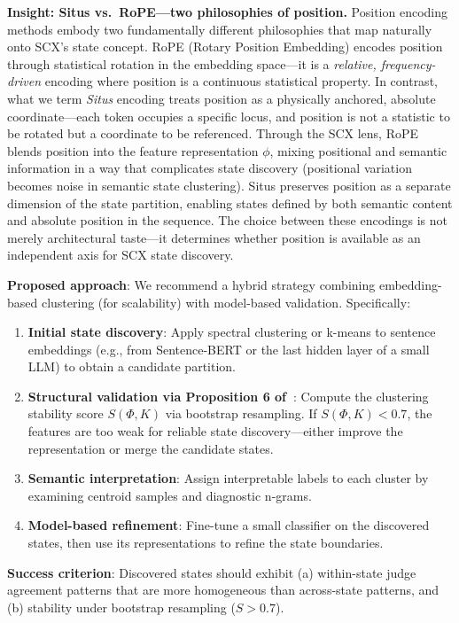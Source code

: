 \documentclass[11pt,twocolumn]{article}
\begin{document}
\textbf{Insight: Situs vs.\ RoPE---two philosophies of position.} Position encoding methods embody two fundamentally different philosophies that map naturally onto SCX's state concept. RoPE (Rotary Position Embedding) encodes position through statistical rotation in the embedding space---it is a \textit{relative, frequency-driven} encoding where position is a continuous statistical property. In contrast, what we term \textit{Situs} encoding treats position as a physically anchored, absolute coordinate---each token occupies a specific locus, and position is not a statistic to be rotated but a coordinate to be referenced. Through the SCX lens, RoPE blends position into the feature representation $\phi$, mixing positional and semantic information in a way that complicates state discovery (positional variation becomes noise in semantic state clustering). Situs preserves position as a separate dimension of the state partition, enabling states defined by both semantic content and absolute position in the sequence. The choice between these encodings is not merely architectural taste---it determines whether position is available as an independent axis for SCX state discovery.

\textbf{Proposed approach}: We recommend a hybrid strategy combining embedding-based clustering (for scalability) with model-based validation. Specifically:
\begin{enumerate}
    \item \textbf{Initial state discovery}: Apply spectral clustering or k-means to sentence embeddings (e.g., from Sentence-BERT or the last hidden layer of a small LLM) to obtain a candidate partition.
    \item \textbf{Structural validation via Proposition 6 of~\cite{scx2026}}: Compute the clustering stability score $S(\Phi, K)$ via bootstrap resampling. If $S(\Phi, K) < 0.7$, the features are too weak for reliable state discovery---either improve the representation or merge the candidate states.
    \item \textbf{Semantic interpretation}: Assign interpretable labels to each cluster by examining centroid samples and diagnostic n-grams.
    \item \textbf{Model-based refinement}: Fine-tune a small classifier on the discovered states, then use its representations to refine the state boundaries.
\end{enumerate}

\textbf{Success criterion}: Discovered states should exhibit (a) within-state judge agreement patterns that are more homogeneous than across-state patterns, and (b) stability under bootstrap resampling ($S > 0.7$).
\end{document}
